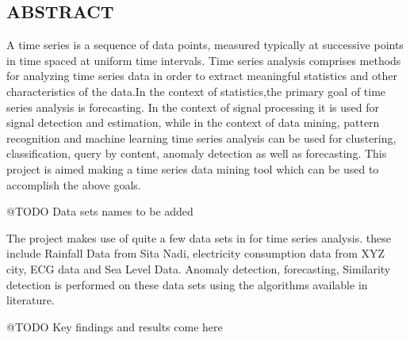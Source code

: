 \documentclass[12pt]{report}
\begin{document}
\newpage

\begin{center}
\section*{ABSTRACT}
\end{center} 
A time series is a sequence of data points, measured typically at successive points in time spaced at uniform time intervals. Time series analysis comprises methods for analyzing time series data in order to extract meaningful statistics and other characteristics of the data.In the context of statistics,the primary goal of time series analysis is forecasting. In the context of signal processing it is used for signal detection and estimation, while in the context of data mining, pattern recognition and machine learning time series analysis can be used for clustering, classification, query by content, anomaly detection as well as forecasting. This project is aimed making a time series data mining tool which can be used to accomplish the above goals. 

@TODO Data sets names to be added 

The project makes use of quite a few data sets in for time series analysis. these include Rainfall Data from Sita Nadi, electricity consumption data from XYZ city, ECG data and Sea Level Data. Anomaly detection, forecasting, Similarity detection is performed on these data sets using the algorithms available in literature. 

@TODO Key findings and results come here




\tableofcontents

\newpage
{}
\listoffigures

\newpage
{}
\listoftables


\newpage


\pagestyle{fancy}
\chead{}
\rfoot{\small{\thepage}}
\renewcommand{\headrulewidth}{0.4pt}
\renewcommand{\footrulewidth}{0.4pt}
\end{document}
